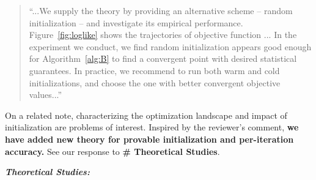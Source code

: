 \documentclass[11pt]{article}
\theoremstyle{plain}
\theoremstyle{definition}
\begin{document}
\begin{enumerate}[wide, labelwidth=!, labelindent=0pt]
     \begin{quote}
     ``...We supply the theory by providing an alternative scheme -- random initialization -- and investigate its empirical performance. Figure~\ref{fig:loglike} shows the trajectories of objective function ... In the experiment we conduct, we find random initialization appears good enough for Algorithm~\ref{alg:B} to find a convergent point with desired statistical guarantees. In practice, we recommend to run both warm and cold initializations, and choose the one with better convergent objective values...''
     \end{quote}
     
     
     On a related note, characterizing the optimization landscape and impact of initialization are problems of interest. Inspired by the reviewer's comment, {\bf we have added new theory for provable initialization and per-iteration accuracy.} See our response to {\bf\# Theoretical Studies}. 
    
     
     \begin{quote}


\end{quote}
     
\end{enumerate}

\vspace{0.2cm}
\textit{\textbf{Theoretical Studies:}}
\end{document}

